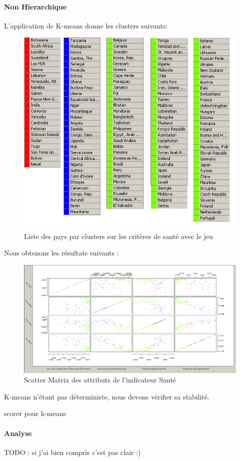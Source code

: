 \paragraph{Non Hierarchique}
L'application de K-means donne les clusters suivants: 

\begin{figure}[H]
	\begin{center}
		\includegraphics[scale=0.5]{Image/TableViewSanteNoMissing2}
		\caption{Liste des pays par clusters sur les critères de santé avec le jeu \jeuc}
	\end{center}
\end{figure}


Nous obtenons les résultats suivants : 

\begin{figure}[H]
	\begin{center}
		\includegraphics[scale=0.5]{Image/ScatterMatrixSanteNoMissing2}
		\caption{Scatter Matrix des attributs de l'indicateur Santé \jeuc}
	\end{center}
\end{figure}

K-means n'étant pas déterministe, nous devons vérifier sa stabilité.

\begin{Huge}


scorer pour k-means 
\end{Huge} 


\paragraph{Analyse}
TODO : si j'ai bien compris c'est pas clair :)



